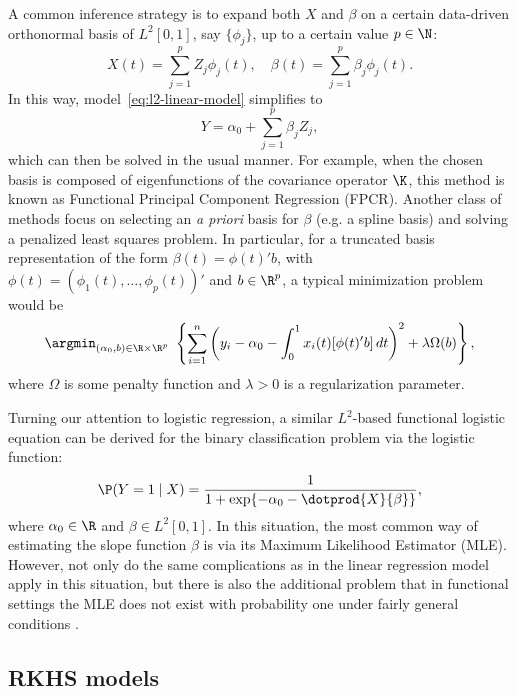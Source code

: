 A common inference strategy is to expand both \(X\) and \(\beta\) on a certain data-driven orthonormal basis of \(L^2[0,1]\), say \(\{\phi_j\}\), up to a certain value \(p\in\N\):
\[
  X(t)=\sum_{j=1}^p Z_j \phi_j(t), \quad \beta(t) = \sum_{j=1}^p \beta_j \phi_j(t).
\]
In this way, model~\eqref{eq:l2-linear-model} simplifies to
\[
Y = \alpha_0 + \sum_{j=1}^p \beta_j Z_j,
\]
which can then be solved in the usual manner. For example, when the chosen basis is composed of eigenfunctions of the covariance operator \(\K\), this method is known as Functional Principal Component Regression (FPCR). Another class of methods focus on selecting an \textit{a priori} basis for \(\beta\) (e.g. a spline basis) and solving a penalized least squares problem. In particular, for a truncated basis representation of the form \(\beta(t)=\phi(t)'b\), with \(\phi(t)=(\phi_1(t), \dots, \phi_p(t))'\) and \(b\in\R^p\), a typical minimization problem would be
\[
\argmin_{(\alpha_0, b)\in\R\times\R^p} \ \left\{ \sum_{i=1}^n \left( y_i - \alpha_0 - \int_0^1 x_i(t)[\phi(t)'b]\, dt\right)^2 + \lambda \Omega(b) \right\},
\]
where \(\Omega\) is some penalty function and \(\lambda>0\) is a regularization parameter.

Turning our attention to logistic regression, a similar \(L^2\)-based functional logistic equation can be derived for the binary classification problem via the logistic function:
\begin{equation}\label{eq:l2-logistic-model}
  \P(Y=1 \mid X) = \frac{1}{1 + \exp\{-\alpha_0 - \dotprod{X}{\beta}\}},
\end{equation}
where \(\alpha_0 \in \R\) and \(\beta \in L^2[0, 1]\). In this situation, the most common way of estimating the slope function \(\beta\) is via its Maximum Likelihood Estimator (MLE). However, not only do the same complications as in the linear regression model apply in this situation, but there is also the additional problem that in functional settings the MLE does not exist with probability one under fairly general conditions \citep[see][Sec.~3.2]{berrendero2018functional}.

\subsection*{RKHS models}

